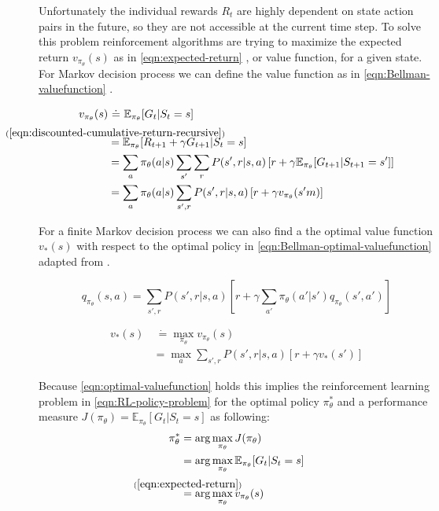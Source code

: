 Unfortunately the individual rewards $R_t$ are highly dependent on state action pairs in the future, so they are not accessible at the current time step. To solve this problem reinforcement algorithms are trying to maximize the expected return $v_{\pi_\theta}(s)$ as in \eqref{eqn:expected-return} \cite{SuttonBartoRLBook}, or value function, for a given state. For Markov decision process we can define the value function as in \eqref{eqn:Bellman-valuefunction} \cite{SuttonBartoRLBook}. 

\begin{align}
	v_{\pi_\theta}(s) & \ \dot{=} \ \mathbb{E}_{\pi_\theta}[G_t | S_t = s] \label{eqn:expected-return} \\
	&\overset{\mathclap{\strut(\ref{eqn:discounted-cumulative-return-recursive})}}{=} \mathbb{E}_{\pi_\theta}[R_{t+1} + \gamma G_{t+1}| S_t = s] \nonumber \\
	& = \sum_a \pi_\theta(a|s) \sum_{s'} \sum_r P(s', r| s, a)\left[r + \gamma \mathbb{E}_{\pi_\theta}[G_{t+1} | S_{t+1} = s']\right] \nonumber \\
	& = \sum_a \pi_\theta(a|s) \sum_{s', r} P(s', r| s, a)\left[r + \gamma v_{\pi_\theta}(s'm)\right] \label{eqn:Bellman-valuefunction}
\end{align}

For a finite Markov decision process we can also find a the optimal value function $v_*(s)$ with respect to the optimal policy in \eqref{eqn:Bellman-optimal-valuefunction} adapted from \cite{SuttonBartoRLBook}.

\begin{equation}\label{eqn:Bellman-action-valuefunction}
	q_{\pi_\theta}(s, a) = \sum_{s', r} P(s', r |s, a) \left[r + \gamma \sum_{a'} \pi_\theta(a'| s')q_{\pi_\theta}(s', a')\right]
\end{equation}

\begin{align}
	v_*(s) & \ \dot{=} \max_{\pi_\theta} v_{\pi_\theta}(s) \label{eqn:optimal-valuefunction} \\
	&=\max_a \sum_{s', r} P(s', r| s, a)[r + \gamma v_*(s')] \label{eqn:Bellman-optimal-valuefunction}
\end{align}

Because \eqref{eqn:optimal-valuefunction} holds this implies the reinforcement learning problem in \eqref{eqn:RL-policy-problem} for the optimal policy $\pi_\theta^*$ and a performance measure $J(\pi_\theta) = \mathbb{E}_{\pi_\theta}[G_t | S_t = s]$ as following:
\begin{align}
	\pi_\theta^* &= \arg \max_{\pi_\theta}J(\pi_\theta) \label{eqn:RL-policy-problem} \\
	&= \arg \max_{\pi_\theta} \mathbb{E}_{\pi_\theta}[G_t | S_t = s] \\
	&\overset{\mathclap{\strut(\ref{eqn:expected-return})}}{=} \arg \max_{\pi_\theta} v_{\pi_\theta}(s) \label{eqn:RL-policy-valuefunction}
\end{align}


